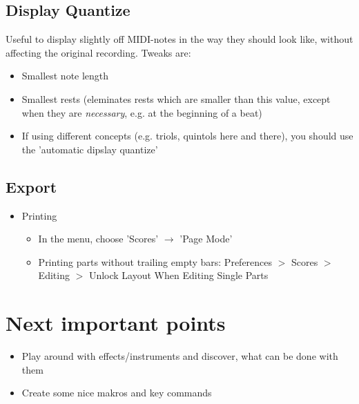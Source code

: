 \documentclass[10pt]{article}
\begin{document}
\subsection{Display Quantize}

Useful to display slightly off MIDI-notes in the way they should look like, without affecting the original recording. Tweaks are:

\begin{itemize}
	\item Smallest note length
	\item Smallest rests (eleminates rests which are smaller than this value, except when they are \textit{necessary}, e.g. at the beginning of a beat)
	\item If using different concepts (e.g. triols, quintols here and there), you should use the 'automatic dipslay quantize'
\end{itemize}

\subsection{Export}

\begin{itemize}
	\item Printing
	\begin{itemize}
		\item In the menu, choose 'Scores' $\rightarrow$ 'Page Mode'
		\item Printing parts without trailing empty bars: Preferences $>$ Scores $>$ Editing $>$ Unlock Layout When Editing Single Parts
	\end{itemize}
\end{itemize}


\section{Next important points}

\begin{itemize}
	\item Play around with effects/instruments and discover, what can be done with them
	\item Create some nice makros and key commands
\end{itemize}
\end{document}
